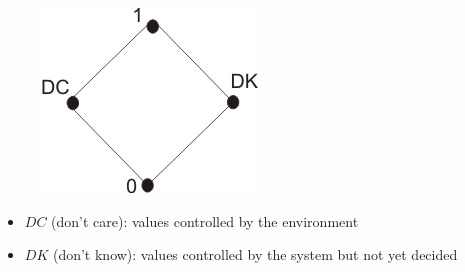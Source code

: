 \begin{frame}
\vspace{-1.5mm}
\begin{figure}[t]
		\includegraphics{figures/LatEx.jpg}
\end{figure}

\vspace{-1mm}
\begin{itemize}
\item \alert{$DC$ (don't care)}: values controlled by the environment 
\item \alert{$DK$ (don't know)}: values controlled by the system but not yet 
decided
\end{itemize}

\end{frame}

